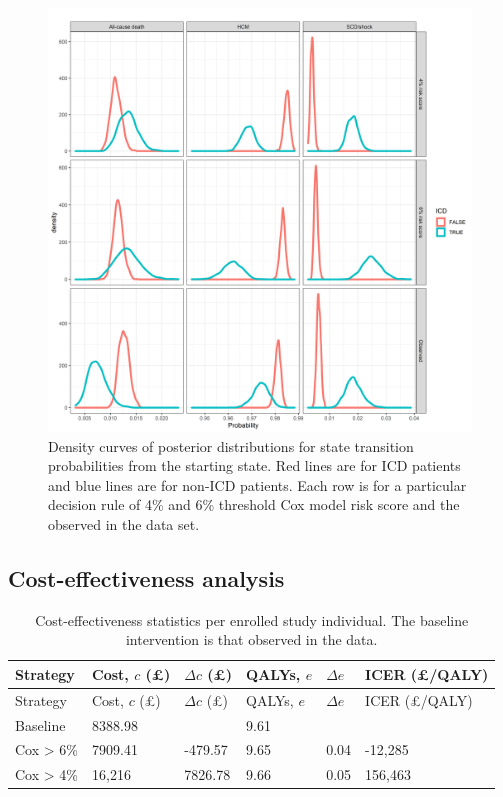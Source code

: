\documentclass[
]{article}
\begin{document}
\begin{figure}

{\centering \includegraphics[width=1\linewidth]{../../images/post_hist} 

}

\caption{Density curves of posterior distributions for state transition probabilities from the starting state. Red lines are for ICD patients and blue lines are for non-ICD patients. Each row is for a particular decision rule of 4\% and 6\% threshold Cox model risk score and the observed in the data set.}\label{fig:transhist}
\end{figure}

\hypertarget{cost-effectiveness-analysis}{%
\subsection{Cost-effectiveness
analysis}\label{cost-effectiveness-analysis}}

\newpage

\begin{longtable}[]{@{}llllll@{}}
\caption{Cost-effectiveness statistics per enrolled study individual.
The baseline intervention is that observed in the data.}\tabularnewline
\toprule
Strategy & Cost, \(c\) (£) & \(\Delta c\) (£) & QALYs, \(e\) &
\(\Delta e\) & ICER (£/QALY) \\
\midrule
\endfirsthead
\toprule
Strategy & Cost, \(c\) (£) & \(\Delta c\) (£) & QALYs, \(e\) &
\(\Delta e\) & ICER (£/QALY) \\
\midrule
\endhead
Baseline & 8388.98 & & 9.61 & & \\
Cox \textgreater{} 6\% & 7909.41 & -479.57 & 9.65 & 0.04 & -12,285 \\
Cox \textgreater{} 4\% & 16,216 & 7826.78 & 9.66 & 0.05 & 156,463 \\
\bottomrule
\end{longtable}
\end{document}
